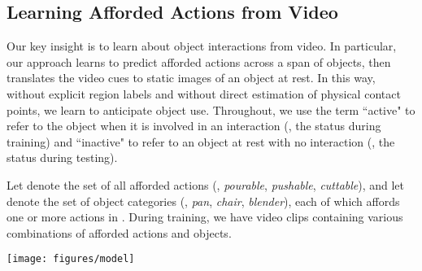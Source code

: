 \documentclass[10pt,twocolumn,letterpaper]{article}
\begin{document}
\subsection{Learning Afforded Actions from Video} \label{sec:action_clf}

Our key insight is to learn about object interactions from video.  In particular, our approach learns to predict afforded actions across a span of objects, then translates the video cues to static images of an object at rest.
In this way, without explicit region labels and without direct estimation of physical contact points, we learn to anticipate object use.
Throughout, we use the term ``active" to refer to the object when it is involved in an interaction (\ie, the status during training) and ``inactive" to refer to an object at rest with no interaction (\ie, the status during testing).


Let  denote the set of all afforded actions (\eg, \emph{pourable}, \emph{pushable}, \emph{cuttable}), and let  denote the set of object categories (\eg, \emph{pan}, \emph{chair}, \emph{blender}), each of which affords one or more actions in . During training, we have video clips containing various combinations of afforded actions and objects.  




\begin{figure*}[htb!]
\centering
\texttt{[image: figures/model]}
\caption{\textbf{Illustration of our framework for training (left) and testing (right)}. \textbf{Left panel}: The two components of our model ---the video action classifier (Sec.~\ref{sec:action_clf}) and the anticipation module with its associated losses (Sec.~\ref{sec:distill} and~\ref{sec:hotspot_modifications})---are jointly trained to predict the action class in a video clip while building an affordance-aware internal representation for objects. \textbf{Right panel}: Once trained, our model generates ``interaction hotspot" maps for a novel \emph{inactive} object image (top left fridge image).  It first hallucinates features that would occur for the object \emph{if it were active} (top right photo), then derives gradient-weighted attention maps over the original image, for each action. Our method can infer hotspots even for novel object categories unseen in the training video; for example, learning about opening microwaves helps anticipate how to open the fridge. Note that ,  are in feature space, not pixel space.
}
\label{fig:model}
\end{figure*}
\end{document}
